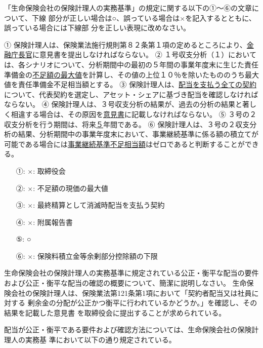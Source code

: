 \documentclass[report,gutter=10mm,fore-edge=10mm,uplatex,dvipdfmx]{jlreq}
\begin{document}
「生命保険会社の保険計理人の実務基準」の規定に関する以下の①～⑥の文章について、下線
部分が正しい場合は○、誤っている場合は×を記入するとともに、誤っている場合には下線部
分を正しい表現に改めなさい。

① 保険計理人は、保険業法施行規則第８２条第１項の定めるところにより、\underline{金融庁長官}に意見書を提出しなければならない。
② １号収支分析（１）においては、各シナリオについて、分析期間中の最初の５年間の事業年度末に生じた責任準備金の\underline{不足額の最大値}を計算し、その値の上位１０％を除いたもののうち最大値を責任準備金不足相当額とする。
③ 保険計理人は、\underline{配当を支払う全ての契約}について、代表契約を選定し、アセット・シェアに基づき配当を確認しなければならない。
④ 保険計理人は、３号収支分析の結果が、過去の分析の結果と著しく相違する場合は、その原因を\underline{意見書}に記載しなければならない。
⑤ ３号の２収支分析を行う期間は、将来\underline{５}年間である。
⑥ 保険計理人は、３号の２収支分析の結果、分析期間中の事業年度末において、事業継続基準に係る額の積立てが可能である場合には\underline{事業継続基準不足相当額}はゼロであると判断することができる。
\answer{}
\begin{itemize}
\item[ ①: ] ×: 取締役会
\item[ ②: ] ×: 不足額の現価の最大値
\item[ ③: ] ×: 最終精算として消滅時配当を支払う契約
\item[ ④: ] ×: 附属報告書
\item[ ⑤: ] ○ 
\item[ ⑥: ] ×: 保険料積立金等余剰部分控除額の下限
\end{itemize}

生命保険会社の保険計理人の実務基準に規定されている公正・衡平な配当の要件および公正・衡平な配当の確認の概要について、簡潔に説明しなさい。
\answer{}
生命保険会社の保険計理人は、保険業法第121条第1項において「契約者配当又は社員に対する
剰余金の分配が公正かつ衡平に行われているかどうか。」を確認し、その結果を記載した意見書
を取締役会に提出することが求められている。

配当が公正・衡平である要件および確認方法については、生命保険会社の保険計理人の実務基
準において以下の通り規定されている。
\end{document}
